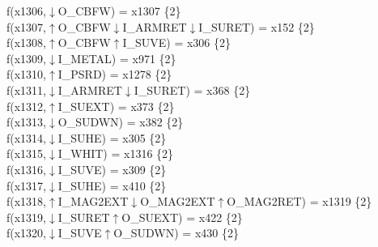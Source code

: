 f(x1306,$\downarrow$O\_CBFW) = x1307 \{2\} \\  
f(x1307,$\uparrow$O\_CBFW$\downarrow$I\_ARMRET$\downarrow$I\_SURET) = x152 \{2\} \\  
f(x1308,$\uparrow$O\_CBFW$\uparrow$I\_SUVE) = x306 \{2\} \\  
f(x1309,$\downarrow$I\_METAL) = x971 \{2\} \\  
f(x1310,$\uparrow$I\_PSRD) = x1278 \{2\} \\  
f(x1311,$\downarrow$I\_ARMRET$\downarrow$I\_SURET) = x368 \{2\} \\  
f(x1312,$\uparrow$I\_SUEXT) = x373 \{2\} \\  
f(x1313,$\downarrow$O\_SUDWN) = x382 \{2\} \\  
f(x1314,$\downarrow$I\_SUHE) = x305 \{2\} \\  
f(x1315,$\downarrow$I\_WHIT) = x1316 \{2\} \\  
f(x1316,$\downarrow$I\_SUVE) = x309 \{2\} \\  
f(x1317,$\downarrow$I\_SUHE) = x410 \{2\} \\  
f(x1318,$\uparrow$I\_MAG2EXT$\downarrow$O\_MAG2EXT$\uparrow$O\_MAG2RET) = x1319 \{2\} \\  
f(x1319,$\downarrow$I\_SURET$\uparrow$O\_SUEXT) = x422 \{2\} \\  
f(x1320,$\downarrow$I\_SUVE$\uparrow$O\_SUDWN) = x430 \{2\} \\  
